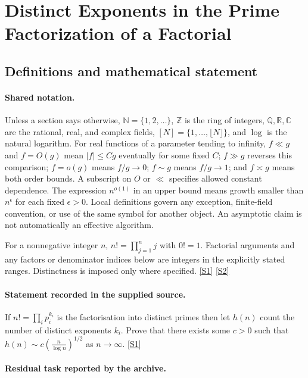 \documentclass[11pt,a4paper]{article}
\newcommand{\N}{\mathbb{N}}
\newcommand{\Z}{\mathbb{Z}}
\newcommand{\Q}{\mathbb{Q}}
\newcommand{\R}{\mathbb{R}}
\newcommand{\C}{\mathbb{C}}
\newcommand{\sref}[2]{\hyperlink{source:#1:#2}{[S#2]}}
\begin{document}
\section{Distinct Exponents in the Prime Factorization of a Factorial}\label{statement}


\subsection{Definitions and mathematical statement}

\paragraph{Shared notation.}Unless a section says otherwise, $\N=\{1,2,\ldots\}$,
$\Z$ is the ring of integers, $\Q,\R,\C$ are the rational, real, and complex
fields, $[N]=\{1,\ldots,\lfloor N\rfloor\}$, and $\log$ is the natural
logarithm. For real functions of a parameter tending to infinity,
$f\ll g$ and $f=O(g)$ mean $|f|\leq Cg$ eventually for some fixed $C$;
$f\gg g$ reverses this comparison; $f=o(g)$ means $f/g\to0$;
$f\sim g$ means $f/g\to1$; and $f\asymp g$ means both order bounds.
A subscript on $O$ or $\ll$ specifies allowed constant dependence.
The expression $n^{o(1)}$ in an upper bound means growth smaller than
$n^\epsilon$ for each fixed $\epsilon>0$. Local definitions govern any
exception, finite-field convention, or use of the same symbol for another
object. An asymptotic claim is not automatically an effective algorithm.



For a nonnegative integer $n$, $n!=\prod_{j=1}^n j$ with $0!=1$. Factorial arguments and any factors or denominator indices below are integers in the explicitly stated ranges. Distinctness is imposed only where specified. \sref{statement}{1} \sref{statement}{2}

\paragraph{Statement recorded in the supplied source.}
If $ n! = \prod_i p_i^{k_i} $ is the factorisation into distinct primes then let $h(n)$ count the number of distinct exponents $k_i$.
Prove that there exists some $c>0$ such that $ h(n) \sim c \left(\frac{n}{\log n}\right)^{1/2} $ as $n\to \infty$. \sref{statement}{1}

\paragraph{Residual task reported by the archive.}
\end{document}
